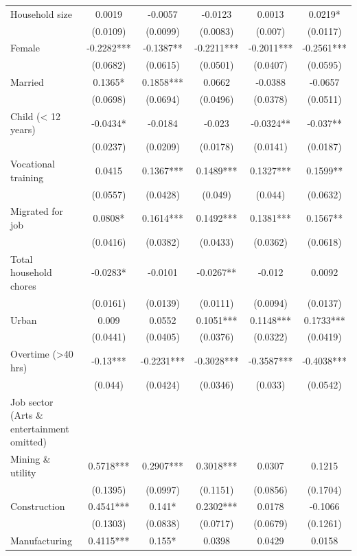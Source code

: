 \begin{table}[htbp]
{\begin{tabular}{lccccc}
\addlinespace
Household size & 0.0019 & -0.0057 & -0.0123 & 0.0013 & 0.0219* \\
& (0.0109) & (0.0099) & (0.0083) & (0.007) & (0.0117) \\
Female & -0.2282*** & -0.1387** & -0.2211*** & -0.2011*** & -0.2561*** \\
& (0.0682) & (0.0615) & (0.0501) & (0.0407) & (0.0595) \\
Married & 0.1365* & 0.1858*** & 0.0662 & -0.0388 & -0.0657 \\
& (0.0698) & (0.0694) & (0.0496) & (0.0378) & (0.0511) \\
Child (< 12 years) & -0.0434* & -0.0184 & -0.023 & -0.0324** & -0.037** \\
& (0.0237) & (0.0209) & (0.0178) & (0.0141) & (0.0187) \\
Vocational training & 0.0415 & 0.1367*** & 0.1489*** & 0.1327*** & 0.1599** \\
& (0.0557) & (0.0428) & (0.049) & (0.044) & (0.0632) \\
Migrated for job & 0.0808* & 0.1614*** & 0.1492*** & 0.1381*** & 0.1567** \\
& (0.0416) & (0.0382) & (0.0433) & (0.0362) & (0.0618) \\
Total household chores & -0.0283* & -0.0101 & -0.0267** & -0.012 & 0.0092 \\
& (0.0161) & (0.0139) & (0.0111) & (0.0094) & (0.0137) \\
Urban & 0.009 & 0.0552 & 0.1051*** & 0.1148*** & 0.1733*** \\
& (0.0441) & (0.0405) & (0.0376) & (0.0322) & (0.0419) \\
Overtime (>40 hrs) & -0.13*** & -0.2231*** & -0.3028*** & -0.3587*** & -0.4038*** \\
& (0.044) & (0.0424) & (0.0346) & (0.033) & (0.0542) \\
Job sector (Arts \& entertainment omitted) &&&&& \\
\hspace{1em}Mining \& utility & 0.5718*** & 0.2907*** & 0.3018*** & 0.0307 & 0.1215 \\
& (0.1395) & (0.0997) & (0.1151) & (0.0856) & (0.1704) \\
\hspace{1em}Construction & 0.4541*** & 0.141* & 0.2302*** & 0.0178 & -0.1066 \\
& (0.1303) & (0.0838) & (0.0717) & (0.0679) & (0.1261) \\
\hspace{1em} Manufacturing & 0.4115*** & 0.155* & 0.0398 & 0.0429 & 0.0158 \\

\end{tabular}}
\end{table}

